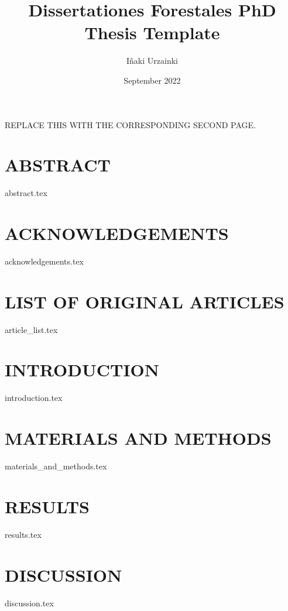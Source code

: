 \documentclass[b5paper, twoside, 10pt]{article}
\title{Dissertationes Forestales PhD Thesis Template}
\author{Iñaki Urzainki}
\date{September 2022}
\begin{document}
\maketitle
\newpage

REPLACE THIS WITH THE CORRESPONDING SECOND PAGE.
\newpage

\section*{ABSTRACT}
{abstract.tex} 
\newpage

\section*{ACKNOWLEDGEMENTS}
{acknowledgements.tex} 
\newpage

\section*{LIST OF ORIGINAL ARTICLES}
{article_list.tex} 
\newpage

\tableofcontents
\newpage


\section{INTRODUCTION}
{introduction.tex} %

\section{MATERIALS AND METHODS}
{materials_and_methods.tex}


\section{RESULTS}
{results.tex}

\section{DISCUSSION}
{discussion.tex}
\newpage

\printbibliography[title = {REFERENCES}]
\end{document}
